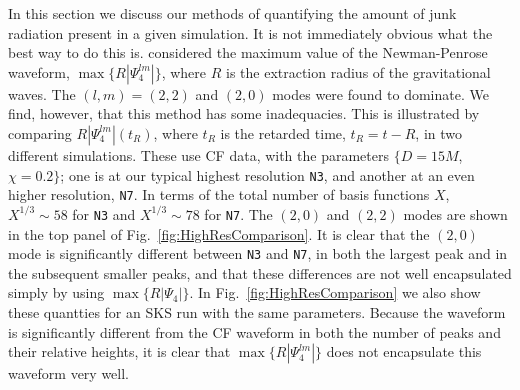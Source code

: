 In this section we discuss our methods of
quantifying the amount of junk radiation present in a given
simulation. It is not immediately obvious what the best way to do this
is.  \cite{Lovelace2009} considered the
maximum value of the Newman-Penrose waveform,
$\max\{R|\Psi_4^{lm}|\}$, where $R$ is the extraction radius of the gravitational waves.  The
  $(l,m)=(2,2)$ and $(2,0)$ modes were found to dominate. We find,
  however, that this method has some inadequacies. This is illustrated
  by comparing $R|\Psi_4^{lm}|(t_R)$, where $t_R$ is the retarded time,
  $t_R=t-R$, in two different simulations. These use CF data, with the parameters $\{D=15M$, $\chi=0.2\}$; one is at our
  typical highest resolution {\tt N3}, and another at an even higher
  resolution, {\tt N7}. In terms of the total number of basis
    functions $X$, $X^{1/3}\sim58$ for {\tt N3} and $X^{1/3}\sim78$ for
    {\tt N7}. The $(2,0)$ and $(2,2)$ modes are shown in the top panel of
  Fig.~\ref{fig:HighResComparison}. It is clear that the $(2,0)$ mode
  is significantly different between {\tt  N3} and {\tt N7}, in both the
  largest peak and in the subsequent smaller peaks, and that these
  differences are not well encapsulated simply by using
  $\max\{R|\Psi_4|\}$. In Fig.~\ref{fig:HighResComparison} we also
  show these quantties for an SKS run with the same parameters. Because
  the waveform is significantly different from the CF waveform in both the
  number of peaks and their relative heights, it is clear that
  $\max\{R|\Psi_4^{lm}|\}$ does not encapsulate this waveform very well.


